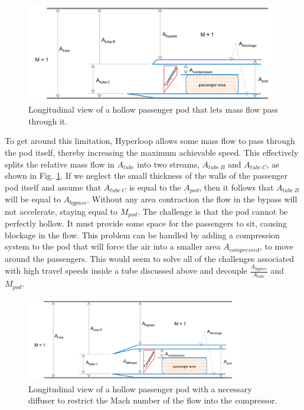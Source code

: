 \documentclass[heading.tex]{subfiles}
\begin{document}
\begin{figure}[hbtp]
\centering
\includegraphics[width=.85\textwidth]{images/hollowCapsule.png}
\caption{Longitudinal view of a hollow passenger pod that lets mass flow pass through it.}
\label{f:hollowPod}
\end{figure}

To get around this limitation, Hyperloop allows some mass flow to pass through the pod itself, thereby increasing
the maximum achievable speed. This effectively splits the relative mass flow in $A_{tube}$ into two streams, 
$A_{tube\ B}$ and  $A_{tube\ C}$, as shown in Fig. \ref{f:hollowPod}. If we neglect the small thickness of the walls of
the passenger pod itself and assume that $A_{tube\ C}$ is equal to the $A_{pod}$, then it follows that $A_{tube\ B}$ 
will be equal to $A_{bypass}$. Without any area contraction the flow in the bypass will not accelerate, staying 
equal to $M_{pod}$. The challenge is that the pod cannot be perfectly hollow. It must provide some space for the passengers
to sit, causing blockage in the flow. This problem can be handled by adding a compression system to the 
pod that will force the air into a smaller area $A_{compressed}$, to move around the passengers. This would 
seem to solve all of the challenges associated with high travel speeds inside a tube discussed above and decouple 
$\frac{A_{bypass}}{A_{tube}}$ and ${M_{pod}}$.


\begin{figure}[hbtp]
\centering
\includegraphics[width=0.85\textwidth]{images/openCapsule.png}
\caption{Longitudinal view of a hollow passenger pod with a necessary diffuser to restrict the Mach number of the flow into the compressor.}
\label{f:OpenPod}
\end{figure}
\end{document}
